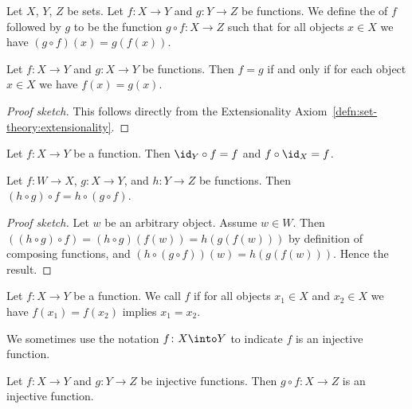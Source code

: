 \begin{definition}
Let $X$, $Y$, $Z$ be sets. Let $f\colon X\to Y$ and $g\colon Y\to Z$
be functions. We define the  of $f$ followed by
$g$ to be the function $g\circ f\colon X\to Z$ such that for all
objects $x\in X$ we have $(g\circ f)(x)=g(f(x))$.
\end{definition}

\begin{theorem}
Let $f\colon X\to Y$ and $g\colon X\to Y$ be functions.
Then $f=g$ if and only if for each object $x\in X$ we have $f(x)=g(x)$.
\end{theorem}

\begin{proof}[Proof sketch]
This follows directly from the Extensionality Axiom~\ref{defn:set-theory:extensionality}.
\end{proof}

\begin{theorem}
Let $f\colon X\to Y$ be a function.
Then $\id_{Y}\circ f=f$ and $f\circ\id_{X}=f$.
\end{theorem}

\begin{theorem}
Let $f\colon W\to X$, $g\colon X\to Y$, and $h\colon Y\to Z$ be functions.
Then $(h\circ g)\circ f=h\circ(g\circ f)$.
\end{theorem}

\begin{proof}[Proof sketch]
Let $w$ be an arbitrary object. Assume $w\in W$. Then
$((h\circ g)\circ f) = (h\circ g)(f(w)) = h(g(f(w)))$ by definition of composing
functions, and $(h\circ(g\circ f))(w)=h(g(f(w)))$. Hence the result.
\end{proof}

\begin{definition}
Let $f\colon X\to Y$ be a function. We call $f$  if
for all objects $x_{1}\in X$ and $x_{2}\in X$ we have
$f(x_{1})=f(x_{2})$ implies $x_{1}=x_{2}$.

We sometimes use the notation $f\colon X\into Y$ to indicate $f$ is an
injective function.
\end{definition}

\begin{theorem}
Let $f\colon X\to Y$ and $g\colon Y\to Z$ be injective functions.
Then $g\circ f\colon X\to Z$ is an injective function.
\end{theorem}

